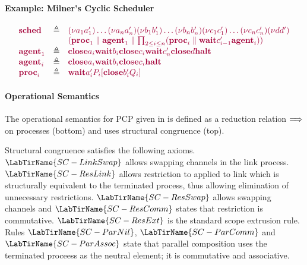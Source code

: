 \documentclass[main.tex]{subfiles}
\begin{document}
\paragraph{Example: Milner's Cyclic Scheduler}\label{sec:pcp-example}
\[
  \begin{array}{lrlr}
    \tm{\sched}
    & \defeq & \tm{\res{a_1}{a'_1}{\dots{\res{a_n}{a'_n}{}}}}
               \tm{\res{b_1}{b'_1}{\dots{\res{b_n}{b'_n}{}}}}
               \tm{\res{c_1}{c'_1}{\dots{\res{c_n}{c'_n}{}}}}
               \tm{\res{d}{d'}{}}
    \\ &     & \tm{(
               \ppar{\proc1}{\agent1}
               \parallel
               \prod_{2\leq{i}\leq{n}}(\ppar{\proc{i}}{\wait{c'_{i-1}}{\agent{i}}})
               )}
    \\
    \tm{\agent1}
    & \defeq & \tm{\close{a_i}{\wait{b_i}{\close{c_i}{\wait{c'_n}{\close{d}{\halt}}}}}}
    \\
    \tm{\agent{i}}
    & \defeq & \tm{\close{a_i}{\wait{b_i}{\close{c_i}{\halt}}}}
    \\
    \tm{\proc{i}}
    & \defeq & \tm{\wait{a'_i}{\plug{P_i}{\close{b'_i}{Q_i}}}}
  \end{array}
\]

\paragraph{Operational Semantics}


The operational semantics for PCP given in  is defined as a reduction relation $\Longrightarrow$ on processes (bottom) and uses structural congruence (top).

Structural congruence satisfies the following axioms. $\LabTirName{SC-LinkSwap}$ allows swapping channels in the link process. $\LabTirName{SC-ResLink}$ allows restriction to applied to link which is structurally equivalent to the terminated process, thus allowing elimination of unnecessary restrictions. $\LabTirName{SC-ResSwap}$ allows swapping channels and $\LabTirName{SC-ResComm}$ states that restriction is commutative. $\LabTirName{SC-ResExt}$ is the standard scope extrusion rule. Rules $\LabTirName{SC-ParNil}$, $\LabTirName{SC-ParComm}$ and $\LabTirName{SC-ParAssoc}$ state that parallel composition uses the terminated proceess as the neutral element; it is commutative and associative.
\end{document}

